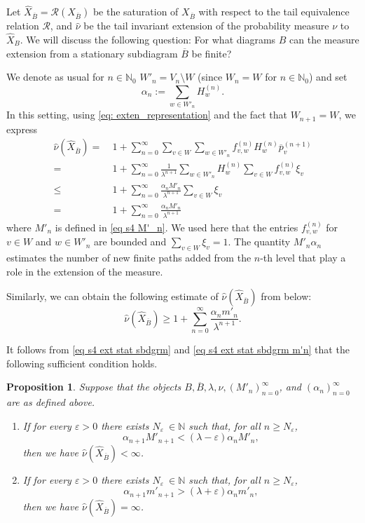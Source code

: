 \documentclass[11pt,reqno]{amsart}
\theoremstyle{definition}
\theoremstyle{remark}
\theoremstyle{plain}
\newtheorem{prop}[definition]{Proposition}
\def\ol{\overline}
\def\ov{\overline}
\def\wh{\widehat}
\newcommand{\N}{\mathbb N}
\newcommand{\be}{\begin{equation}}
\newcommand{\ee}{\end{equation}}
\newcommand{\ba}{\begin{aligned}}
\newcommand{\ea}{\end{aligned}}
\numberwithin{equation}{section}
\begin{document}
Let $\wh X_{\ov B} = \mathcal{R}(X_{\ov B})$ be the saturation of $X_{\ov B}$ with respect to the tail equivalence relation $\mathcal{R}$, and $\wh{\nu}$ be the 
tail invariant extension of the probability measure $ \nu$ to $\wh X_{B}$. 
We will discuss the following question: For what diagrams $B$ can the measure extension from a stationary subdiagram $\ol B$ be finite? 

We denote as usual for $n \in \N_0$
$W'_n = V_n \setminus W$ (since $W_n = W$ for $n \in \N_0$) and set
$$
\alpha_n := \sum_{w \in W'_n} H_w^{(n)}.
$$
In this setting, using \eqref{eq: exten_representation} and the fact that $W_{n+1} = W$, we express 
\be\label{eq s4 ext stat sbdgrm}
\ba
\wh \nu(\wh X_{\ov B}) = &\  1 + \sum_{n = 0}^{\infty} \sum_{v \in W} \sum_{w\in W'_n} f^{(n)}_{v,w} H_w^{(n)} \ol p^{(n+1)}_v \\
= &\ 1 + \sum_{n = 0}^{\infty} \frac{1}{\lambda^{n+1}} \sum_{w\in W'_n}  H_w^{(n)} \sum_{v \in W} f^{(n)}_{v,w} \xi_v  \\ 
\leq  &\ 1 + \sum_{n = 0}^{\infty} \frac{\alpha_n M'_n}{\lambda^{n+1}}
\sum_{v \in W} \xi_v\\
= &\ 1 + \sum_{n = 0}^{\infty} \frac{\alpha_n M'_n}{\lambda^{n+1}}
\ea
\ee
where $M'_n$ is defined in \eqref{eq s4 M'_n}. We used here that the entries $f^{(n)}_{v,w}$ for $v \in W$ and $w \in W'_{n}$ are bounded and  $\sum_{v\in W} \xi_v =1$. The quantity $M'_n \alpha_n$ estimates the number of new finite paths added from the $n$-th level that play a role in the extension of the measure.

Similarly, we can obtain the following estimate of $\wh \nu(\wh X_{\ov B})$ from below:
\be\label{eq s4 ext stat sbdgrm m'n}
\wh \nu(\wh X_{\ov B}) \geq 1 + \sum_{n = 0}^{\infty} \frac{\alpha_n m'_n}{\lambda^{n+1}}.
\ee

It follows from \eqref{eq s4 ext stat sbdgrm} and \eqref{eq s4 ext stat sbdgrm m'n} that the following sufficient condition holds.

\begin{prop}\label{prop ext from stat BD}
Suppose that the objects $B, \ol B, \lambda,\nu, (M'_n)_{n=0}^{\infty}$, and $(\alpha_n)_{n=0}^{\infty}$ are as defined above. 
\begin{enumerate}
    \item If for every $\varepsilon >0$ there exists $N_\varepsilon\ \in \N$ such that, for all $n \geq N_\varepsilon$, 
$$
\alpha_{n+1} M'_{n+1} < (\lambda - \varepsilon)\alpha_n M'_n,
$$
then we have $\wh \nu(\wh X_{\ov B}) < \infty$.
\item If for every $\varepsilon >0$ there exists $N_\varepsilon\ \in \N$ such that, for all $n \geq N_\varepsilon$, 
$$
\alpha_{n+1} m'_{n+1} > (\lambda + \varepsilon)\alpha_n m'_n,
$$
then we have $\wh \nu(\wh X_{\ov B}) = \infty$.
\end{enumerate}
\end{prop}
\end{document}
